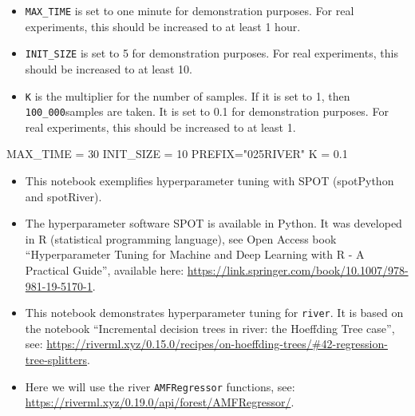 \documentclass[
  letterpaper,
  DIV=11,
  numbers=noendperiod]{scrreprt}
\newenvironment{Shaded}{\begin{snugshade}}{\end{snugshade}}
\newcommand{\DecValTok}[1]{\textcolor[rgb]{0.68,0.00,0.00}{#1}}
\newcommand{\FloatTok}[1]{\textcolor[rgb]{0.68,0.00,0.00}{#1}}
\newcommand{\NormalTok}[1]{\textcolor[rgb]{0.00,0.23,0.31}{#1}}
\newcommand{\OperatorTok}[1]{\textcolor[rgb]{0.37,0.37,0.37}{#1}}
\newcommand{\StringTok}[1]{\textcolor[rgb]{0.13,0.47,0.30}{#1}}
\providecommand{\tightlist}{%
  \setlength{\itemsep}{0pt}\setlength{\parskip}{0pt}}\usepackage{longtable,booktabs,array}
\begin{document}
\begin{tcolorbox}[enhanced jigsaw, coltitle=black, bottomrule=.15mm, breakable, toprule=.15mm, colframe=quarto-callout-caution-color-frame, title=\textcolor{quarto-callout-caution-color}{\faFire}\hspace{0.5em}{Caution: Run time and initial design size should be increased for real
experiments}, colbacktitle=quarto-callout-caution-color!10!white, opacityback=0, left=2mm, leftrule=.75mm, colback=white, rightrule=.15mm, bottomtitle=1mm, toptitle=1mm, titlerule=0mm, arc=.35mm, opacitybacktitle=0.6]

\begin{itemize}
\tightlist
\item
  \texttt{MAX\_TIME} is set to one minute for demonstration purposes.
  For real experiments, this should be increased to at least 1 hour.
\item
  \texttt{INIT\_SIZE} is set to 5 for demonstration purposes. For real
  experiments, this should be increased to at least 10.
\item
  \texttt{K} is the multiplier for the number of samples. If it is set
  to 1, then \texttt{100\_000}samples are taken. It is set to 0.1 for
  demonstration purposes. For real experiments, this should be increased
  to at least 1.
\end{itemize}

\end{tcolorbox}

\begin{Shaded}
\begin{Highlighting}[]
\NormalTok{MAX\_TIME }\OperatorTok{=} \DecValTok{30}
\NormalTok{INIT\_SIZE }\OperatorTok{=} \DecValTok{10}
\NormalTok{PREFIX}\OperatorTok{=}\StringTok{"025RIVER"}
\NormalTok{K }\OperatorTok{=} \FloatTok{0.1}
\end{Highlighting}
\end{Shaded}

\begin{itemize}
\tightlist
\item
  This notebook exemplifies hyperparameter tuning with SPOT (spotPython
  and spotRiver).
\item
  The hyperparameter software SPOT is available in Python. It was
  developed in R (statistical programming language), see Open Access
  book ``Hyperparameter Tuning for Machine and Deep Learning with R - A
  Practical Guide'', available here:
  \url{https://link.springer.com/book/10.1007/978-981-19-5170-1}.
\item
  This notebook demonstrates hyperparameter tuning for \texttt{river}.
  It is based on the notebook ``Incremental decision trees in river: the
  Hoeffding Tree case'', see:
  \url{https://riverml.xyz/0.15.0/recipes/on-hoeffding-trees/\#42-regression-tree-splitters}.
\item
  Here we will use the river \texttt{AMFRegressor} functions, see:
  \url{https://riverml.xyz/0.19.0/api/forest/AMFRegressor/}.
\end{itemize}
\end{document}
